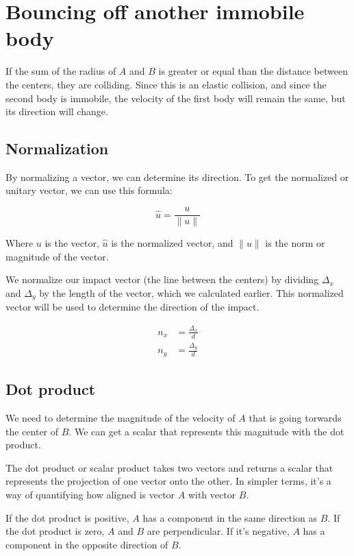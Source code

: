 \documentclass{amsart}
\begin{document}
\newpage

\section{Bouncing off another immobile body}

If the sum of the radius of \(A\) and \(B\) is greater or equal than the
distance between the centers, they are colliding. Since this is an elastic
collision, and since the second body is immobile, the velocity of the first body
will remain the same, but its direction will change.

\subsection{Normalization}

By normalizing a vector, we can determine its direction. To get the normalized
or unitary vector, we can use this formula:

\begin{displaymath}
  \hat{u} = \frac{u}{\|u\|}
\end{displaymath}

Where \(u\) is the vector, \(\hat{u}\) is the normalized vector, and \(\|u\|\)
is the norm or magnitude of the vector.

We normalize our impact vector (the line between the centers) by dividing
\(\Delta_x\) and \(\Delta_y\) by the length of the vector, which we calculated
earlier. This normalized vector will be used to determine the direction of the
impact.

\begin{align*}
  n_x &= \frac{\Delta_x}{d} \\
  n_y &= \frac{\Delta_y}{d}
\end{align*}

\subsection{Dot product}

We need to determine the magnitude of the velocity of \(A\) that is going
torwards the center of \(B\). We can get a scalar that represents this magnitude
with the dot product.

The dot product or scalar product takes two vectors and returns a scalar that
represents the projection of one vector onto the other. In simpler terms, it's a
way of quantifying how aligned is vector \(A\) with vector \(B\).

If the dot product is positive, \(A\) has a component in the same direction as
\(B\). If the dot product is zero, \(A\) and \(B\) are perpendicular. If it's
negative, \(A\) has a component in the opposite direction of \(B\).
\end{document}
